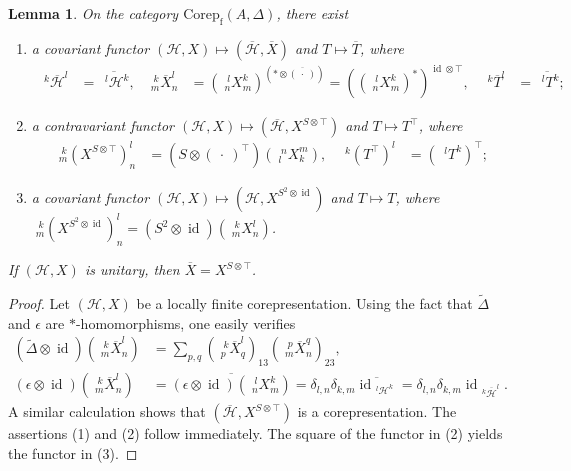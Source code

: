\documentclass[12pt]{article}
\theoremstyle{change}
\newcommand{\Corep}{\mathrm{Corep_{f}}}
\DeclareMathOperator{\id}{id}
\newcommand{\Gr}[5]{\;{}^{\;#2}_{#4}#1_{#5}^{#3}}%
\newcommand{\Gru}[3]{\;{}^{\;#2}#1^{#3}}
\newtheorem{Lem}[Theorem]{Lemma}
\theoremstyle{definition}
\numberwithin{equation}{section}
\begin{document}
\begin{Lem} \label{lemma:rep-functors}
   On the category
  $\Corep(A,\Delta)$, there exist
  \begin{enumerate}
  \item a covariant functor $(\mathcal{H},X) \mapsto
    (\overline{\mathcal{H}},\overline{X})$ and $T \mapsto
    \overline{T}$, where
    \begin{align*}
      \Gru{\overline{\mathcal{H}}}{k}{l} &= \overline{\Gru{\mathcal{H}}{l}{k}},
      & \Gr{\overline{X}}{k}{l}{m}{n} &= (\Gr{X}{l}{k}{n}{m})^{(*
        \otimes \overline{(\ \cdot \ ) })}
      =((\Gr{X}{l}{k}{n}{m})^{*})^{\id \otimes \top}, &
      \Gru{\overline{T}}{k}{l} &= \overline{\Gru{T}{l}{k}};
    \end{align*}
  \item a contravariant functor $(\mathcal{H},X) \mapsto
    (\overline{\mathcal{H}},X^{S\otimes \top})$ and
    $T\mapsto T^{\top}$, where 
    \begin{align*}
      \Gr{(X^{S\otimes \top})}{k}{l}{m}{n} &= (S \otimes (\ \cdot \
      )^{\top})(\Gr{X}{n}{m}{l}{k}), & \Gru{(T^{\top})}{k}{l}
      &=(\Gru{T}{l}{k})^{\top};
    \end{align*}
  \item a covariant functor  $(\mathcal{H},X) \mapsto (\mathcal{H},X^{S^{2}\otimes \id})$
    and $T\mapsto T$, where $\Gr{(X^{S^{2}\otimes \id})}{k}{l}{m}{n}=(S^{2} \otimes
  \id)(\Gr{X}{k}{l}{m}{n})$.
  \end{enumerate}
  If $(\mathcal{H},X)$ is unitary, then $\overline{X}=X^{S\otimes \top}$.\end{Lem}
\begin{proof}
  Let $(\mathcal{H},X)$ be a locally finite corepresentation. Using the fact that $\tilde \Delta$ and $\epsilon$ are
  $*$-homomorphisms, one easily verifies
  \begin{align*}
    (\tilde \Delta \otimes \id)( \Gr{\overline{X}}{k}{l}{m}{n}) &=
    \sum_{p,q} ( \Gr{\overline{X}}{k}{l}{p}{q})_{13}
    ( \Gr{\overline{X}}{p}{q}{m}{n})_{23}, \\
    (\epsilon \otimes \id)(\Gr{\overline{X}}{k}{l}{m}{n}) &=
    \overline{(\epsilon \otimes \id)(\Gr{X}{l}{k}{n}{m})}
    = \delta_{l,n}\delta_{k,m}
    \overline{\id_{\Gru{\mathcal{H}}{l}{k}}}
    = \delta_{l,n}\delta_{k,m} \id_{\Gru{\overline{\mathcal{H}}}{k}{l}}.
  \end{align*}
  A similar calculation shows that
  $(\overline{\mathcal{H}},X^{S\otimes \top})$ is a
  corepresentation. The assertions (1) and (2) follow
  immediately. The square of the functor in (2) yields the functor in
  (3).  
\end{proof}
\end{document}
